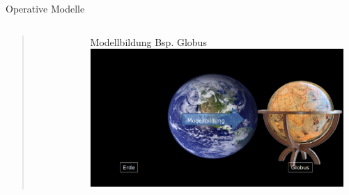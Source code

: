 \begin{frame}{Operative Modelle}
  \begin{columns}[T,onlytextwidth]
    
    \begin{quote} 
    \end{quote}
        \begin{block}{\cite[131]{stachowiak}}
        \begin{quote}
            
        \end{quote}
    \end{block}
      \begin{block}{\footnotesize Modellbildung Bsp. Globus}
      \includegraphics[width=0.95\textwidth]{img/modell-globus2.png}
      \end{block}

  \end{columns}

\begin{columns}[T,onlytextwidth]




\end{columns}
\end{frame}
